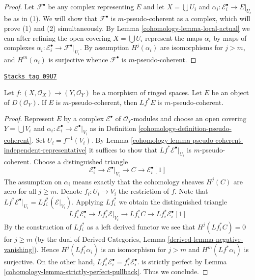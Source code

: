 \begin{proof}

Let $\mathcal{F}^\bullet$ be any complex representing $E$
and let $X = \bigcup U_i$ and
$\alpha_i : \mathcal{E}_i^\bullet \to E|_{U_i}$ be as in (1).
We will show that $\mathcal{F}^\bullet$ is $m$-pseudo-coherent
as a complex, which will prove (1) and (2) simultaneously.
By Lemma \ref{cohomology-lemma-local-actual}
we can after refining the open covering $X = \bigcup U_i$
represent the maps $\alpha_i$ by maps of complexes
$\alpha_i : \mathcal{E}_i^\bullet \to \mathcal{F}^\bullet|_{U_i}$.
By assumption
$H^j(\alpha_i)$ are isomorphisms for $j > m$, and $H^m(\alpha_i)$
is surjective whence $\mathcal{F}^\bullet$ is
$m$-pseudo-coherent.
\end{proof}

\begin{lemma}
\label{cohomology-lemma-pseudo-coherent-pullback}
\href{https://stacks.math.columbia.edu/tag/09U7}{\texttt{Stacks tag 09U7}}

Let $f : (X, \mathcal{O}_X) \to (Y, \mathcal{O}_Y)$
be a morphism of ringed spaces. Let $E$ be an object of
$D(\mathcal{O}_Y)$. If $E$ is $m$-pseudo-coherent,
then $Lf^*E$ is $m$-pseudo-coherent.
\end{lemma}

\begin{proof}

Represent $E$ by a complex $\mathcal{E}^\bullet$ of $\mathcal{O}_Y$-modules
and choose an open covering $Y = \bigcup V_i$ and
$\alpha_i : \mathcal{E}_i^\bullet \to \mathcal{E}^\bullet|_{V_i}$
as in Definition \ref{cohomology-definition-pseudo-coherent}.
Set $U_i = f^{-1}(V_i)$.
By Lemma \ref{cohomology-lemma-pseudo-coherent-independent-representative}
it suffices to show that $Lf^*\mathcal{E}^\bullet|_{U_i}$ is
$m$-pseudo-coherent.
Choose a distinguished triangle
$$
\mathcal{E}_i^\bullet \to
\mathcal{E}^\bullet|_{V_i} \to
C \to
\mathcal{E}_i^\bullet[1]
$$
The assumption on $\alpha_i$ means exactly that the cohomology sheaves
$H^j(C)$ are zero for all $j \geq m$. Denote $f_i : U_i \to V_i$
the restriction of $f$. Note that $Lf^*\mathcal{E}^\bullet|_{U_i} =
Lf_i^*(\mathcal{E}|_{V_i})$. Applying $Lf_i^*$ we obtain
the distinguished triangle
$$
Lf_i^*\mathcal{E}_i^\bullet \to
Lf_i^*\mathcal{E}|_{V_i} \to
Lf_i^*C \to
Lf_i^*\mathcal{E}_i^\bullet[1]
$$
By the construction of $Lf_i^*$ as a left derived functor we see that
$H^j(Lf_i^*C) = 0$ for $j \geq m$ (by the dual of Derived Categories, Lemma
\ref{derived-lemma-negative-vanishing}). Hence $H^j(Lf_i^*\alpha_i)$ is an
isomorphism for $j > m$ and $H^m(Lf^*\alpha_i)$ is surjective.
On the other hand,
$Lf_i^*\mathcal{E}_i^\bullet = f_i^*\mathcal{E}_i^\bullet$.
is strictly perfect by Lemma \ref{cohomology-lemma-strictly-perfect-pullback}.
Thus we conclude.
\end{proof}

